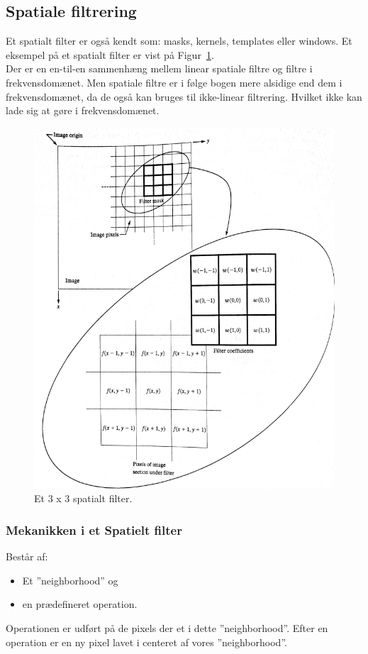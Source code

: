 \subsection{Spatiale filtrering}
Et spatialt filter er også kendt som: masks, kernels, templates eller windows. Et eksempel på et spatialt filter er vist på Figur~\ref{fig:spatial-filter}.\\

Der er en en-til-en sammenhæng mellem linear spatiale filtre og filtre i frekvensdomænet. Men spatiale filtre er i følge bogen mere alsidige end dem i frekvensdomænet, da de også kan bruges til ikke-linear filtrering. Hvilket ikke kan lade sig at gøre i frekvensdomænet.

\begin{figure}[H]
	\centering
	\includegraphics[width=0.8\linewidth]{figs/spm02/spatial-filter}
	\caption{Et 3 x 3 spatialt filter.}
	\label{fig:spatial-filter}
\end{figure}

\subsubsection{Mekanikken i et Spatielt filter}
Består af: 

\begin{itemize}
	\item Et ''neighborhood'' og 
	\item en prædefineret operation.
\end{itemize}

Operationen er udført på de pixels der et i dette ''neighborhood''. Efter en operation er en ny pixel lavet i centeret af vores ''neighborhood''.